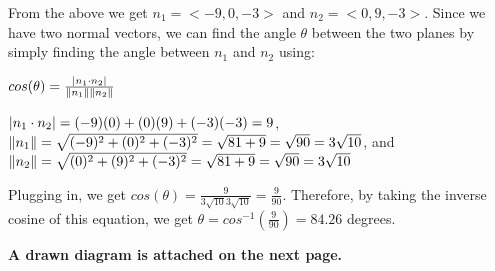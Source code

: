 \documentclass{article}
\begin{document}
\par\noindent\large From the above we get $n_{1} = <-9, 0, -3>$ and $n_{2} = <0, 9, -3>$.  Since we have two normal vectors, we can find the angle $\theta$ between the two planes by simply finding the angle between $n_{1}$ and $n_{2}$ using:
\begin{center}
    \Large $cos(\theta) = \frac{\abs{n_{1} \cdot n_{2}}}{\norm{n_{1}} \norm{n_{2}}}$
\end{center}

\par\noindent\large $\abs{n_{1} \cdot n_{2}} = (-9)(0) + (0)(9) + (-3)(-3) = 9$, $\norm{n_{1}} = \sqrt{(-9)^{2} + (0)^{2} + (-3)^{2}} = \sqrt{81 + 9} = \sqrt{90} = 3\sqrt{10}$, and $\norm{n_{2}} = \sqrt{(0)^{2} + (9)^{2} + (-3)^{2}} = \sqrt{81 + 9} = \sqrt{90} = 3\sqrt{10}$ \vspace{0.25cm}

\par\noindent\large Plugging in, we get \Large $cos(\theta) = \frac{9}{3\sqrt{10} 3\sqrt{10}} = \frac{9}{90}$.  \large Therefore, by taking the inverse cosine of this equation, we get \Large $\theta = cos^{-1}(\frac{9}{90}) = 84.26$ degrees.\vspace{0.25cm}

\begin{center}
\textbf{A drawn diagram is attached on the next page.}
\end{center}
\end{document}
